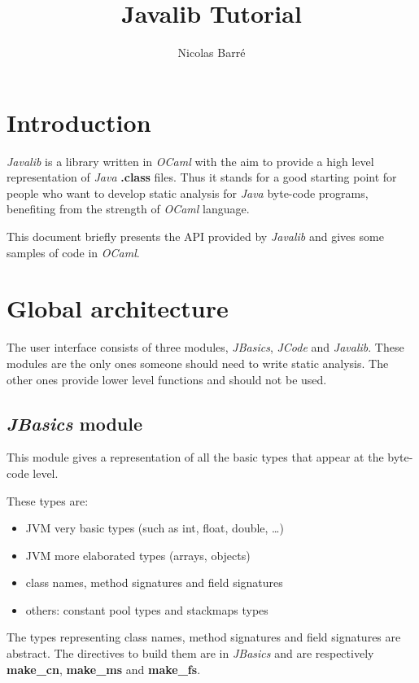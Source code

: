 \documentclass{article}
\title{Javalib Tutorial}
\author{Nicolas Barré}
\begin{document}
\maketitle
\newpage

\tableofcontents
\newpage
\section{Introduction}

\emph{Javalib} is a library written in \emph{OCaml} with the aim to
provide a high level representation of \emph{Java} \textbf{.class}
files. Thus it stands for a good starting point for people who want
to develop static analysis for \emph{Java} byte-code programs,
benefiting from the strength of \emph{OCaml} language.

This document briefly presents the API provided by \emph{Javalib}
and gives some samples of code in \emph{OCaml}.

\section{Global architecture}

The user interface consists of three modules, \emph{JBasics},
\emph{JCode} and \emph{Javalib}. These modules are the only ones
someone should need to write static analysis. The other ones
provide lower level functions and should not be used.

\subsection{\emph{JBasics} module}

This module gives a representation of all the basic types that
appear at the byte-code level.

These types are:

\begin{itemize}
\item
  JVM very basic types (such as int, float, double, \ldots{})
\item
  JVM more elaborated types (arrays, objects)
\item
  class names, method signatures and field signatures
\item
  others: constant pool types and stackmaps types
\end{itemize}
The types representing class names, method signatures and field
signatures are abstract. The directives to build them are in
\emph{JBasics} and are respectively \textbf{make\_cn},
\textbf{make\_ms} and \textbf{make\_fs}.
\end{document}
